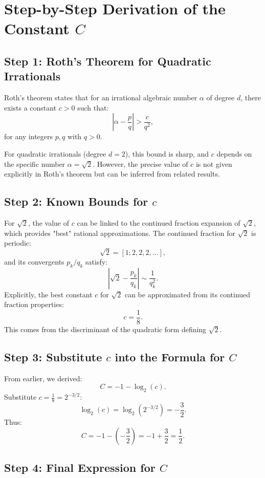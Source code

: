 \section*{Step-by-Step Derivation of the Constant \(C\)}

\subsection*{Step 1: Roth's Theorem for Quadratic Irrationals}

Roth's theorem states that for an irrational algebraic number \(\alpha\) of degree \(d\), there exists a constant \(c > 0\) such that:
\[
\left|\alpha - \frac{p}{q}\right| > \frac{c}{q^2},
\]
for any integers \(p, q\) with \(q > 0\).

For quadratic irrationals (degree \(d = 2\)), this bound is sharp, and \(c\) depends on the specific number \(\alpha = \sqrt{2}\). However, the precise value of \(c\) is not given explicitly in Roth's theorem but can be inferred from related results.

\subsection*{Step 2: Known Bounds for \(c\)}

For \(\sqrt{2}\), the value of \(c\) can be linked to the continued fraction expansion of \(\sqrt{2}\), which provides "best" rational approximations. The continued fraction for \(\sqrt{2}\) is periodic:
\[
\sqrt{2} = [1; 2, 2, 2, \ldots],
\]
and its convergents \(p_k / q_k\) satisfy:
\[
\left|\sqrt{2} - \frac{p_k}{q_k}\right| \sim \frac{1}{q_k^2}.
\]
Explicitly, the best constant \(c\) for \(\sqrt{2}\) can be approximated from its continued fraction properties:
\[
c = \frac{1}{8}.
\]
This comes from the discriminant of the quadratic form defining \(\sqrt{2}\).

\subsection*{Step 3: Substitute \(c\) into the Formula for \(C\)}

From earlier, we derived:
\[
C = -1 - \log_2(c).
\]
Substitute \(c = \frac{1}{8} = 2^{-3/2}\):
\[
\log_2(c) = \log_2(2^{-3/2}) = -\frac{3}{2}.
\]
Thus:
\[
C = -1 - \left(-\frac{3}{2}\right) = -1 + \frac{3}{2} = \frac{1}{2}.
\]

\subsection*{Step 4: Final Expression for \(C\)}

